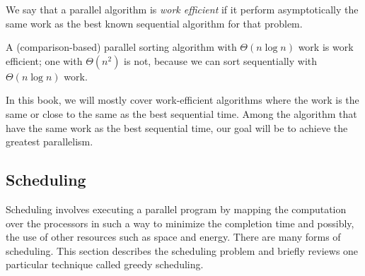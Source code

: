 \begin{flex}
\label{grp:def:analysis::models::work-efficiency}

\begin{definition}
\label{def:analysis::models::work-efficiency}
 We say that a parallel algorithm is {\em
  work efficient} if it perform asymptotically the same work as the best known sequential algorithm for that problem. 

\end{definition}

\begin{example}
\label{xmpl:analysis::models::comparison-based}
A (comparison-based) parallel sorting algorithm with
$\Theta(n\log{n})$ work is work efficient; one with $\Theta(n^2)$ is
not, because we can sort sequentially with $\Theta(n\log{n})$ work.

\end{example}
\end{flex}

\begin{cluster}
\label{grp:nt:analysis::models::book}

\begin{note}
\label{nt:analysis::models::book}
In this book, we will mostly cover work-efficient algorithms where
the work is the same or close to the same as the best sequential time.
Among the algorithm that have the same work as the best sequential
time, our goal will be to achieve the greatest parallelism.

\end{note}
\end{cluster}


\subsection{Scheduling}
\label{sec:analysis::models::language::scheduling}

\begin{cluster}
\label{grp:grm:analysis::models::scheduling}

\begin{gram}
\label{grm:analysis::models::scheduling}
Scheduling involves executing a parallel program by mapping the
computation over the processors in such a way to minimize
the completion time and possibly, the use of other resources such as
space and energy.
There are many forms of scheduling.
This section describes the scheduling problem and briefly reviews one
particular technique called greedy scheduling.

\end{gram}
\end{cluster}


